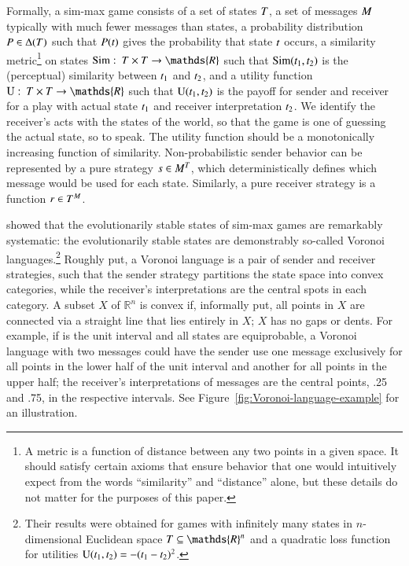 \documentclass[fleqn,reqno,10pt]{article}
\newcommand{\similarity}{\ensuremath{\mathrm{Sim}}} %
\renewcommand{\Pr}{\ensuremath{P}}
\begin{document}
Formally, a sim-max game consists of a set of states $T$, a set of messages $M$ typically with much
fewer messages than states, a probability distribution $\Pr \in \Delta(\States)$ such that
$\Pr(\state)$ gives the probability that state $t$ occurs, a similarity metric\footnote{A
  metric is a function of distance between any two points in a given space. It should satisfy
  certain axioms that ensure behavior that one would intuitively expect from the words
  ``similarity'' and ``distance'' alone, but these details do not matter for the purposes of
  this paper.}
on states $\similarity \mycolon \States \times \States \rightarrow \mathds{R}$ such that
$\similarity(\mystate{1}, \mystate{2})$ is the (perceptual) similarity between $t_{\mathrm{1}}$
and $t_{\mathrm{2}}$, and a utility function
$\Utils \mycolon \States \times \States \rightarrow \mathds{R}$ such that
$\mathrm{U}(t_{\mathrm{1}}, t_{\mathrm{2}})$ is the payoff for sender and receiver for a play with actual
state $t_{\mathrm{1}}$ and receiver interpretation $t_{\mathrm{2}}$. We identify the receiver's acts
with the states of the world, so that the game is one of guessing the actual state, so to
speak. The utility function should be a monotonically increasing function of similarity.
Non-probabilistic sender behavior can be represented by a pure strategy
$s \in M^T$, which deterministically defines which message would be used for
each state. Similarly, a pure receiver strategy is a function $r \in T^M$.


\citet{JagerMetzger2011:Voronoi-Languag} showed that the evolutionarily stable states of
sim-max games are remarkably systematic: the evolutionarily stable states are demonstrably
so-called Voronoi languages.\footnote{Their results were obtained for games with infinitely
  many states in $n$-dimensional Euclidean space $\States \subseteq \mathds{R}^n$ and a
  quadratic loss function for utilities
  $\mathrm{U}(t_{\mathrm{1}}, t_{\mathrm{2}}) = - (t_{\mathrm{1}} - t_{\mathrm{2}})^2$.} Roughly put, a Voronoi
language is a pair of sender and receiver strategies, such that the sender strategy partitions
the state space into convex categories, while the receiver's interpretations are the central
spots in each category. A subset $X$ of $\mathds{R}^n$ is convex if, informally put, all points
in $X$ are connected via a straight line that lies entirely in $X$; $X$ has no gaps or
dents. For example, if \States is the unit interval and all states are equiprobable, a Voronoi
language with two messages could have the sender use one message exclusively for all points in
the lower half of the unit interval and another for all points in the upper half; the
receiver's interpretations of messages are the central points, .25 and .75, in the respective
intervals.  See Figure~\ref{fig:Voronoi-language-example} for an illustration.
\end{document}
